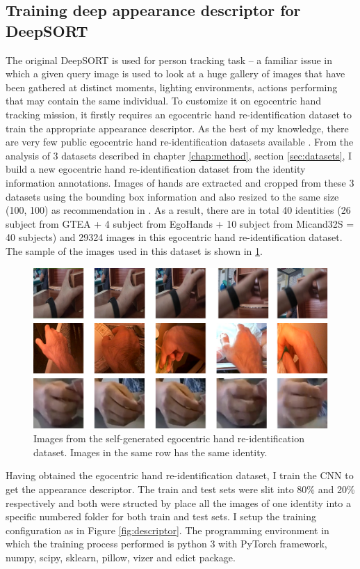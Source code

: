 \subsection{Training deep appearance descriptor for DeepSORT} \label{subsec:train_deep}
The original DeepSORT is used for person tracking task – a familiar issue in which a given query image is used to look at a huge gallery of images that have been gathered at distinct moments, lighting environments, actions performing that may contain the same individual. To customize it on egocentric hand tracking mission, it firstly requires an egocentric hand re-identification dataset to train the appropriate appearance descriptor. As the best of my knowledge, there are very few public egocentric hand re-identification datasets available \cite{9064606}. From the analysis of 3 datasets described in chapter \ref{chap:method}, section \ref{sec:datasets}, I build a new egocentric hand re-identification dataset from the identity information annotations. Images of hands are extracted and cropped from these 3 datasets using the bounding box information and also resized to the same size (100, 100) as recommendation in  \cite{DBLP:journals/corr/abs-1812-00442}. As a result, there are in total 40 identities (26 subject from GTEA + 4 subject from EgoHands + 10 subject from Micand32S = 40 subjects) and 29324 images in this egocentric hand re-identification dataset. The sample of the images used in this dataset is shown in \ref{fig:reid}.
\begin{figure}[!htb]
	\centerline{\includegraphics[width=1\linewidth]{Figs/reid.png}}
	\caption{Images from the self-generated egocentric hand re-identification dataset. Images in the same row has the same identity.}
	\label{fig:reid}
\end{figure}
Having obtained the egocentric hand re-identification dataset, I train the CNN to get the appearance descriptor. The train and test sets were slit into 80\% and 20\% respectively and both were structed by place all the images of one identity into a specific numbered folder for both train and test sets. I setup the training configuration as in Figure \ref{fig:descriptor}. The programming environment in which the training process performed is python 3 with PyTorch framework, numpy, scipy, sklearn, pillow, vizer and edict package.
